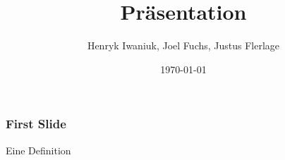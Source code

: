 \documentclass{beamer}
\title{Präsentation}
\author{Henryk Iwaniuk, Joel Fuchs, Justus Flerlage}
\date{\today}
\begin{document}
\maketitle
\frame{\tableofcontents[currentsection]}

\begin{frame}
  \frametitle{First Slide}
  \begin{Definition}
    Eine Definition
  \end{Definition}
\end{frame}
\end{document}
